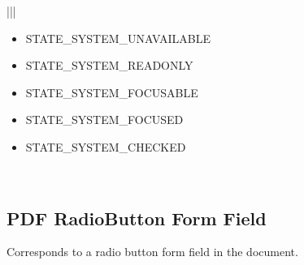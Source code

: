 \documentclass[letterpaper,12pt,english,openany,oneside]{sphinxmanual}
\begin{document}
\begin{savenotes}
\begin{tabular}[t]{|*{2}{|}}
\begin{itemize}
\item {} 
STATE\_SYSTEM\_UNAVAILABLE

\item {} 
STATE\_SYSTEM\_READONLY

\item {} 
STATE\_SYSTEM\_FOCUSABLE

\item {} 
STATE\_SYSTEM\_FOCUSED

\item {} 
STATE\_SYSTEM\_CHECKED

\end{itemize}
\\
\hline
\end{tabular}
\par
\sphinxattableend\end{savenotes}




\subsection{PDF RadioButton Form Field}
\label{\detokenize{MSAA_PDF:pdf-radiobutton-form-field}}
Corresponds to a radio button form field in the document.
\end{document}
